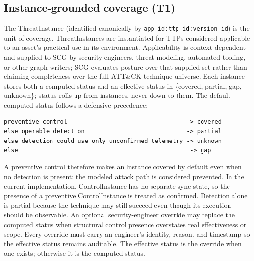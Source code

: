\documentclass[10pt]{article}
\newcommand{\code}[1]{\texttt{#1}}
\begin{document}
\subsection{Instance-grounded coverage (T1)}
The ThreatInstance (identified canonically by \code{app\_id:ttp\_id:version\_id}) is the unit of coverage. ThreatInstances are instantiated for TTPs considered applicable to an asset's practical use in its environment. Applicability is context-dependent and supplied to SCG by security engineers, threat modeling, automated tooling, or other graph writers; SCG evaluates posture over that supplied set rather than claiming completeness over the full ATT\&CK technique universe. Each instance stores both a computed status and an effective status in \{covered, partial, gap, unknown\}; status rolls up from instances, never down to them. The default computed status follows a defensive precedence:

\begin{Verbatim}[fontsize=\small]
preventive control                                  -> covered
else operable detection                             -> partial
else detection could use only unconfirmed telemetry -> unknown
else                                                 -> gap
\end{Verbatim}

A preventive control therefore makes an instance covered by default even when no detection is present: the modeled attack path is considered prevented. In the current implementation, ControlInstance has no separate sync state, so the presence of a preventive ControlInstance is treated as confirmed. Detection alone is partial because the technique may still succeed even though its execution should be observable. An optional security-engineer override may replace the computed status when structural control presence overstates real effectiveness or scope. Every override must carry an engineer's identity, reason, and timestamp so the effective status remains auditable. The effective status is the override when one exists; otherwise it is the computed status.
\end{document}
